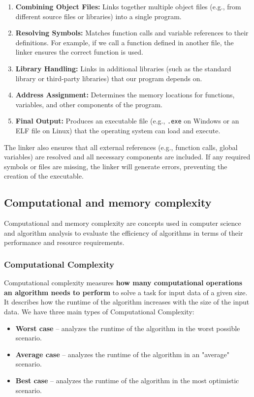 \documentclass[../main]{subfiles}
\begin{document}
\begin{enumerate}
    \item \textbf{Combining Object Files:} Links together multiple object files (e.g., from different source files or libraries) into a single program.
    \item \textbf{Resolving Symbols:} Matches function calls and variable references to their definitions. For example, if we call a function defined in another file, the linker ensures the correct function is used.
    \item \textbf{Library Handling:} Links in additional libraries (such as the standard library or third-party libraries) that our program depends on.
    \item \textbf{Address Assignment:} Determines the memory locations for functions, variables, and other components of the program.
    \item \textbf{Final Output:} Produces an executable file (e.g., \texttt{.exe} on Windows or an ELF file on Linux) that the operating system can load and execute.
\end{enumerate}

    The linker also ensures that all external references (e.g., function calls,
global variables) are resolved and all necessary components are included. If any required symbols or files are missing, the linker will generate errors, preventing the creation of the executable.

\subsection{Computational and memory complexity}
Computational and memory complexity are concepts used in computer science and algorithm analysis to evaluate the efficiency of algorithms in terms of their performance and resource requirements.

\subsubsection{Computational Complexity}
Computational complexity measures \textbf{how many computational operations an algorithm needs to perform} to solve a task for input data of a given size.
It describes how the runtime of the algorithm increases with the size of the input data. We have three main types of Computational Complexity:
\begin{itemize}
    \item \textbf{Worst case} – analyzes the runtime of the algorithm in the worst possible scenario.
    \item \textbf{Average case} – analyzes the runtime of the algorithm in an "average" scenario.
    \item \textbf{Best case} – analyzes the runtime of the algorithm in the most optimistic scenario.
\end{itemize}
\end{document}
